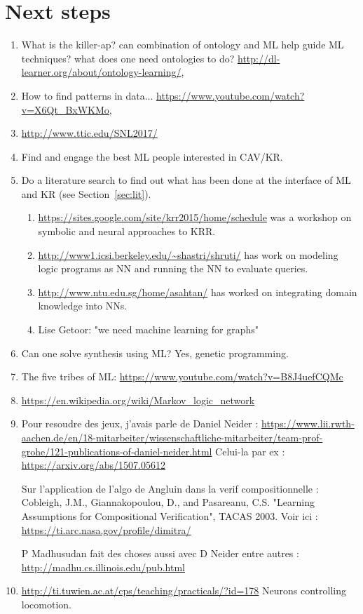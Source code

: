\documentclass[a4paper,10pt]{article}
\begin{document}
\section{Next steps}
\begin{enumerate}
 \item What is the killer-ap? can combination of ontology and ML help guide ML
 techniques? what does one need ontologies to do?
 \url{http://dl-learner.org/about/ontology-learning/}, 
 \item How to find patterns in data... 
 \url{https://www.youtube.com/watch?v=X6Qt_BxWKMo},

 \item \url{http://www.ttic.edu/SNL2017/}
 \item Find and engage the best ML people interested in CAV/KR.
 \item Do a literature search to find out what has been done at the interface of ML and KR (see Section~\ref{sec:lit}).
 \begin{enumerate}
  \item \url{https://sites.google.com/site/krr2015/home/schedule} was a workshop on symbolic and neural approaches to KRR.
  \item \url{http://www1.icsi.berkeley.edu/~shastri/shruti/} has work on modeling logic programs as NN and running the NN to evaluate queries.
  \item \url{http://www.ntu.edu.sg/home/asahtan/} has worked on integrating domain knowledge into NNs.
  \item Lise Getoor: "we need machine learning for graphs"
 \end{enumerate}
  \item Can one solve synthesis using ML? Yes, genetic programming.
 \item The five tribes of ML: \url{https://www.youtube.com/watch?v=B8J4uefCQMc}
 \item \url{https://en.wikipedia.org/wiki/Markov_logic_network}

 \item 
Pour resoudre des jeux, j'avais parle de Daniel Neider :
 \url{https://www.lii.rwth-aachen.de/en/18-mitarbeiter/wissenschaftliche-mitarbeiter/team-prof-grohe/121-publications-of-daniel-neider.html}
 Celui-la par ex : \url{https://arxiv.org/abs/1507.05612}

 Sur l'application de l'algo de Angluin dans la verif compositionnelle :
 Cobleigh, J.M., Giannakopoulou, D., and Pasareanu, C.S. "Learning Assumptions
 for Compositional Verification", TACAS 2003.
 Voir ici : \url{https://ti.arc.nasa.gov/profile/dimitra/}

 P Madhusudan fait des choses aussi avec D Neider entre autres :
 \url{http://madhu.cs.illinois.edu/pub.html}
\item \url{http://ti.tuwien.ac.at/cps/teaching/practicals/?id=178} Neurons controlling locomotion.
\end{enumerate}
\end{document}
